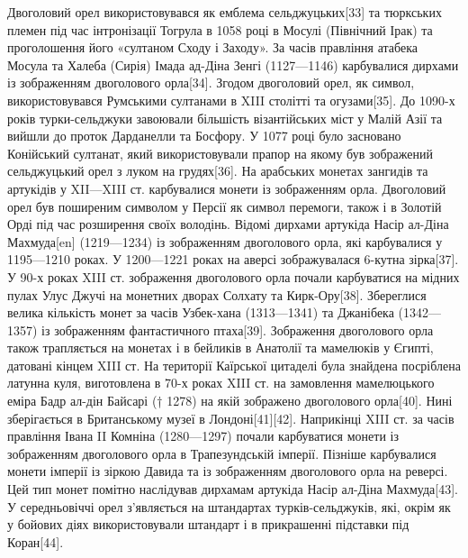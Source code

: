 \begin{multicols}{2}
Двоголовий орел використовувався як емблема сельджуцьких[33] та тюркських
племен під час інтронізації Тогрула в 1058 році в Мосулі (Північний Ірак) та
проголошення його «султаном Сходу і Заходу». За часів правління атабека Мосула
та Халеба (Сирія) Імада ад-Діна Зенгі (1127—1146) карбувалися дирхами із
зображенням двоголового орла[34]. Згодом двоголовий орел, як символ,
використовувався Румськими султанами в XIII столітті та огузами[35]. До 1090-х
років турки-сельджуки завоювали більшість візантійських міст у Малій Азії та
вийшли до проток Дарданелли та Босфору. У 1077 році було засновано Конійський
султанат, який використовували прапор на якому був зображений сельджуцький орел
з луком на грудях[36]. На арабських монетах зангидів та артукідів у XII—XIII
ст. карбувалися монети із зображенням орла. Двоголовий орел був поширеним
символом у Персії як символ перемоги, також і в Золотій Орді під час розширення
своїх володінь. Відомі дирхами артукіда Насір ал-Діна Махмуда[en] (1219—1234)
із зображенням двоголового орла, які карбувалися у 1195—1210 роках. У 1200—1221
роках на аверсі зображувалася 6-кутна зірка[37]. У 90-х роках XIII ст.
зображення двоголового орла почали карбуватися на мідних пулах Улус Джучі на
монетних дворах Солхату та Кирк-Ору[38]. Збереглися велика кількість монет за
часів Узбек-хана (1313—1341) та Джанібека (1342—1357) із зображенням
фантастичного птаха[39]. Зображення двоголового орла також трапляється на
монетах і в бейликів в Анатолії та мамелюків у Єгипті, датовані кінцем XIII ст.
На території Каїрської цитаделі була знайдена посріблена латунна куля,
виготовлена в 70-х роках XIII ст. на замовлення мамелюцького еміра Бадр ал-дін
Байсарі († 1278) на якій зображено двоголового орла[40]. Нині зберігається в
Британському музеї в Лондоні[41][42]. Наприкінці XIII ст. за часів правління
Івана II Комніна (1280—1297) почали карбуватися монети із зображенням
двоголового орла в Трапезундській імперії. Пізніше карбувалися монети імперії
із зіркою Давида та із зображенням двоголового орла на реверсі. Цей тип монет
помітно наслідував дирхамам артукіда Насір ал-Діна Махмуда[43]. У середньовіччі
орел з'являється на штандартах турків-сельджуків, які, окрім як у бойових діях
використовували штандарт і в прикрашенні підставки під Коран[44]. 

\end{multicols} %
